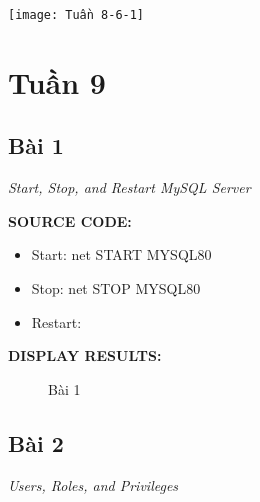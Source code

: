 \documentclass[12pt,a4paper]{report}
\begin{document}
	\texttt{[image: Tuần 8-6-1]}

\newpage
\section{Tuần 9}
\subsection{Bài 1}
	\begin{center}
		{\it Start, Stop, and Restart MySQL Server}
	\end{center}
	
	{\bf SOURCE CODE:}
	\begin{itemize}
		\item Start: net START MYSQL80
		\item Stop: net STOP MYSQL80
		\item Restart: 
	\end{itemize}
	
	{\bf DISPLAY RESULTS:}
		\begin{figure}[!h]
		\hfill
		\hfill
 		\hfill
		\caption{Bài 1}
		\end{figure}


\subsection{Bài 2}
	\begin{center}
		{\it Users, Roles, and Privileges}
	\end{center}
	
\end{document}
